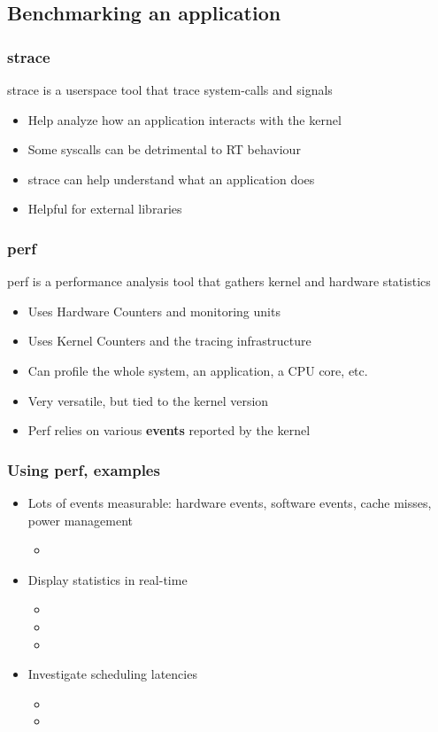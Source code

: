 \subsection{Benchmarking an application}
\begin{frame}
	\frametitle{strace}
	strace is a userspace tool that trace system-calls and signals
	\begin{itemize}
		\item Help analyze how an application interacts with the kernel
		\item Some syscalls can be detrimental to RT behaviour
		\item strace can help understand what an application does
		\item Helpful for external libraries
	\end{itemize}
\end{frame}

\begin{frame}
	\frametitle{perf}
	perf is a performance analysis tool that gathers kernel and hardware statistics
	\begin{itemize}
		\item Uses Hardware Counters and monitoring units
		\item Uses Kernel Counters and the tracing infrastructure
		\item Can profile the whole system, an application, a CPU core, etc.
		\item Very versatile, but tied to the kernel version
		\item Perf relies on various \textbf{events} reported by the kernel
	\end{itemize}
\end{frame}

\begin{frame}
	\frametitle{Using perf, examples}
	\begin{itemize}
		\item Lots of events measurable: hardware events, software events, cache misses, power management
			\begin{itemize}
				\item {}
			\end{itemize}
		\item Display statistics in real-time
			\begin{itemize}
				\item {}
				\item {}
				\item {}
			\end{itemize}
		\item Investigate scheduling latencies
			\begin{itemize}
				\item {}
				\item {}
			\end{itemize}
	\end{itemize}
\end{frame}

